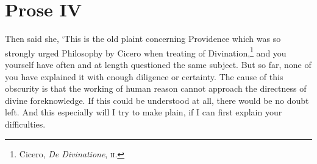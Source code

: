 \section*{Prose IV}

Then said she, `This is the old plaint concerning Providence which was
so strongly urged Philosophy by Cicero when treating of
Divination,\footnote{Cicero, \textit{De Divinatione}, \textsc{ii}.}
and you yourself have often and at length questioned the same subject.
But so far, none of you have explained it with enough diligence or
certainty. The cause of this obscurity is that the working of human
reason cannot approach the directness of divine foreknowledge. If this
could be understood at all, there would be no doubt left. And this
especially will I try to make plain, if I can first explain your
difficulties.

